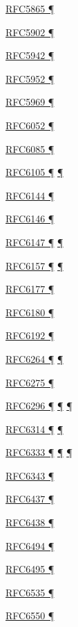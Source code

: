 \documentclass[
]{article}
\begin{document}
\hyperref[traffic-class-and-flow-label]{RFC5865 ¶}

\hyperref[translation-and-ipv4-as-a-service]{RFC5902 ¶}

\hyperref[auto-configuration]{RFC5942 ¶}

\hyperref[addresses]{RFC5952 ¶}

\hyperref[tunnels]{RFC5969 ¶}

\hyperref[translation-and-ipv4-as-a-service]{RFC6052 ¶}

\hyperref[layer-2-functions]{RFC6085 ¶}

\hyperref[layer-2-considerations]{RFC6105 ¶}
\hyperref[obsolete-features-in-ipv6]{¶}

\hyperref[translation-and-ipv4-as-a-service]{RFC6144 ¶}

\hyperref[translation-and-ipv4-as-a-service]{RFC6146 ¶}

\hyperref[obsolete-techniques]{RFC6147 ¶}
\hyperref[translation-and-ipv4-as-a-service]{¶}

\hyperref[dual-stack-scenarios]{RFC6157 ¶} \hyperref[multihoming]{¶}

\hyperref[address-planning]{RFC6177 ¶}

\hyperref[coexistence-with-legacy-ipv4]{RFC6180 ¶}

\hyperref[filtering]{RFC6192 ¶}

\hyperref[obsolete-techniques]{RFC6264 ¶} \hyperref[tunnels]{¶}

\hyperref[obsolete-features-in-ipv6]{RFC6275 ¶}

\hyperref[translation-and-ipv4-as-a-service]{RFC6296 ¶}
\hyperref[security]{¶} \hyperref[multihoming]{¶}

\hyperref[translation-and-ipv4-as-a-service]{RFC6314 ¶}
\hyperref[multihoming]{¶}

\hyperref[dual-stack-scenarios]{RFC6333 ¶}
\hyperref[translation-and-ipv4-as-a-service]{¶} \hyperref[tunnels]{¶}

\hyperref[obsolete-techniques]{RFC6343 ¶}

\hyperref[traffic-class-and-flow-label]{RFC6437 ¶}

\hyperref[traffic-class-and-flow-label]{RFC6438 ¶}

\hyperref[obsolete-features-in-ipv6]{RFC6494 ¶}

\hyperref[obsolete-features-in-ipv6]{RFC6495 ¶}

\hyperref[obsolete-techniques]{RFC6535 ¶}

\hyperref[routing]{RFC6550 ¶}
\end{document}
